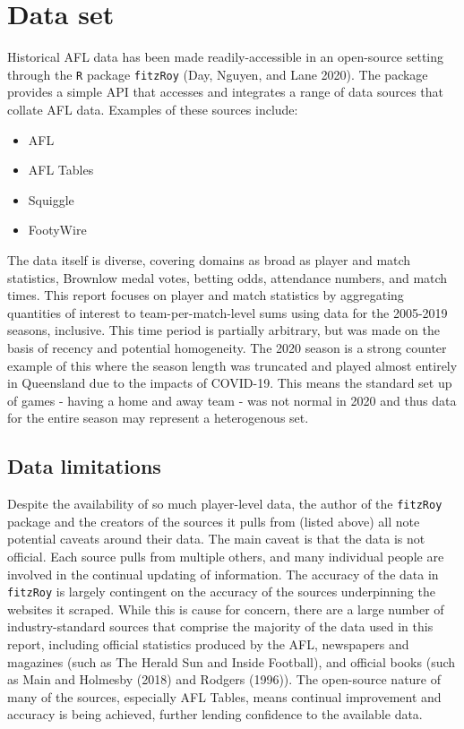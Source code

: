 \documentclass{article}
\begin{document}
\hypertarget{data-set}{%
\section{Data set}\label{data-set}}

Historical AFL data has been made readily-accessible in an open-source
setting through the \texttt{R} package \texttt{fitzRoy} (Day, Nguyen,
and Lane 2020). The package provides a simple API that accesses and
integrates a range of data sources that collate AFL data. Examples of
these sources include:

\begin{itemize}
  \item{AFL}
  \item{AFL Tables}
  \item{Squiggle}
  \item{FootyWire}
\end{itemize}

The data itself is diverse, covering domains as broad as player and
match statistics, Brownlow medal votes, betting odds, attendance
numbers, and match times. This report focuses on player and match
statistics by aggregating quantities of interest to team-per-match-level
sums using data for the 2005-2019 seasons, inclusive. This time period
is partially arbitrary, but was made on the basis of recency and
potential homogeneity. The 2020 season is a strong counter example of
this where the season length was truncated and played almost entirely in
Queensland due to the impacts of COVID-19. This means the standard set
up of games - having a home and away team - was not normal in 2020 and
thus data for the entire season may represent a heterogenous set.

\hypertarget{data-limitations}{%
\subsection{Data limitations}\label{data-limitations}}

Despite the availability of so much player-level data, the author of the
\texttt{fitzRoy} package and the creators of the sources it pulls from
(listed above) all note potential caveats around their data. The main
caveat is that the data is not official. Each source pulls from multiple
others, and many individual people are involved in the continual
updating of information. The accuracy of the data in \texttt{fitzRoy} is
largely contingent on the accuracy of the sources underpinning the
websites it scraped. While this is cause for concern, there are a large
number of industry-standard sources that comprise the majority of the
data used in this report, including official statistics produced by the
AFL, newspapers and magazines (such as The Herald Sun and Inside
Football), and official books (such as Main and Holmesby (2018) and
Rodgers (1996)). The open-source nature of many of the sources,
especially AFL Tables, means continual improvement and accuracy is being
achieved, further lending confidence to the available data.
\end{document}

